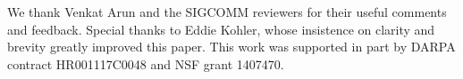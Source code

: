 \label{s:acknowledgements}
 We thank
Venkat Arun and the SIGCOMM reviewers for their useful comments and feedback. Special thanks to Eddie Kohler, whose insistence on clarity and brevity greatly improved this paper.
This work was supported in part by DARPA contract HR001117C0048 and NSF grant 1407470.
